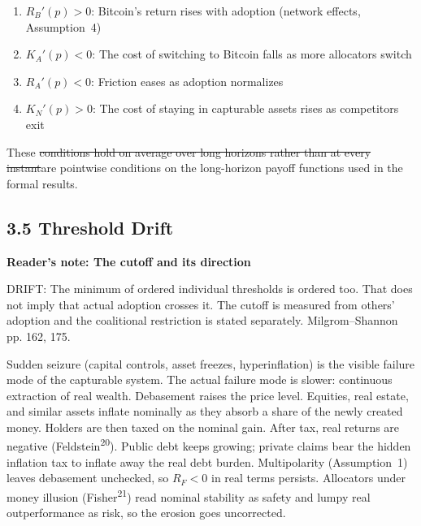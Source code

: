 \documentclass[12pt]{article}
\theoremstyle{definition}
\theoremstyle{remark}
\providecommand{\DIFaddtex}[1]{{\color{AddedText}#1}}
\providecommand{\DIFdeltex}[1]{{\color{DeletedText}\sout{#1}}}
\providecommand{\DIFaddbegin}{}
\providecommand{\DIFaddend}{}
\providecommand{\DIFdelbegin}{}
\providecommand{\DIFdelend}{}
\newcommand{\ReviewNote}[2]{\par\begin{mdframed}[backgroundcolor=blue!3,linecolor=NoteText,linewidth=0.6pt]\color{NoteText}\small\textbf{Reader's note: #1}\par #2\end{mdframed}\par}
\providecommand{\DIFadd}[1]{\texorpdfstring{\DIFaddtex{#1}}{#1}} %
\providecommand{\DIFdel}[1]{\texorpdfstring{\DIFdeltex{#1}}{}} %
\begin{document}
\begin{enumerate}[label=(M\arabic*),nosep]
\item $R_B'(p) > 0$: Bitcoin's return rises with adoption (network effects, Assumption~4)
\item $K_A'(p) < 0$: The cost of switching to Bitcoin falls as more allocators switch
\item $R_A'(p) < 0$: Friction eases as adoption normalizes
\item $K_N'(p) > 0$: The cost of staying in capturable assets rises as competitors exit
\end{enumerate}

\smallskip
\noindent These \DIFdelbegin \DIFdel{conditions hold on average over long
horizons rather than at every instant}\DIFdelend \DIFaddbegin \DIFadd{are pointwise conditions on the long-horizon payoff functions used in the formal results}\DIFaddend .

\subsection{3.5 Threshold Drift}


\ReviewNote{The cutoff and its direction}{DRIFT: The minimum of ordered individual thresholds is ordered too. That does not imply that actual adoption crosses it. The cutoff is measured from others' adoption and the coalitional restriction is stated separately. Milgrom--Shannon pp. 162, 175.}
Sudden seizure (capital controls, asset freezes, hyperinflation) is the visible failure mode of the capturable system. The actual failure mode is slower: continuous extraction of real wealth. Debasement raises the price level. Equities, real estate, and similar assets inflate nominally as they absorb a share of the newly created money. Holders are then taxed on the nominal gain. After tax, real returns are negative (Feldstein\textsuperscript{20}). Public debt keeps growing; private claims bear the hidden inflation tax to inflate away the real debt burden. Multipolarity (Assumption~1) leaves debasement unchecked, so $R_F < 0$ in real terms persists. Allocators under money illusion (Fisher\textsuperscript{21}) read nominal stability as safety and lumpy real outperformance as risk, so the erosion goes uncorrected.
\end{document}

